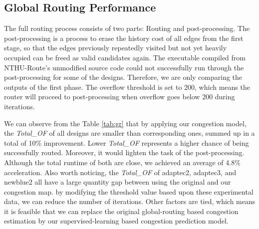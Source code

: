 \subsection{Global Routing Performance}
The full routing process consists of two parts: Routing and post-processing. The post-processing is a process to erase the history cost of all edges from the first stage, so that the edges previously repeatedly visited but not yet heavily occupied can be freed as valid candidates again. The executable compiled from NTHU-Route's unmodified source code could not successfully run through the post-processing for some of the designs. Therefore, we are only comparing the outputs of the first phase. The overflow threshold is set to 200, which means the router will proceed to post-processing when overflow goes below 200 during iterations.

We can observe from the Table \ref{tab:gr} that by applying our congestion model, the \textit{Total\_OF} of all designs are smaller than corresponding ones, summed up in a total of 10\% improvement. Lower \textit{Total\_OF} represents a higher chance of being successfully routed. Moreover, it would lighten the task of the post-processing. Although the total runtime of both are close, we achieved an average of 4.8\% acceleration. Also worth noticing, the \textit{Total\_OF} of adaptec2, adaptec3, and newblue2 all have a large quantity gap between using the original and our congestion map. by modifying the threshold value based upon these experimental data, we can reduce the number of iterations. Other factors are tied, which means it is feasible that we can replace the original global-routing based congestion estimation by our supervised-learning based congestion prediction model.


